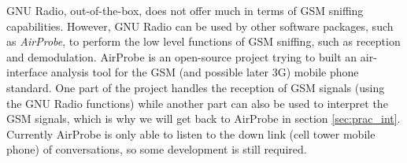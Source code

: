 \documentclass[a4paper,11pt]{llncs}
\begin{document}
GNU Radio, out-of-the-box, does not offer much in terms of GSM sniffing capabilities. However, GNU Radio can be used by other software packages, such as \textit{AirProbe}, to perform the low level functions of GSM sniffing, such as reception and demodulation. AirProbe \cite{url:airprobe} is an open-source project trying to built an air-interface analysis tool for the GSM (and possible later 3G) mobile phone standard. One part of the project handles the reception of GSM signals (using the GNU Radio functions) while another part can also be used to interpret the GSM signals, which is why we will get back to AirProbe in section \ref{sec:prac_int}.
Currently AirProbe is only able to listen to the down link (cell tower  mobile phone) of conversations, so some development is still required.\\  
\end{document}
